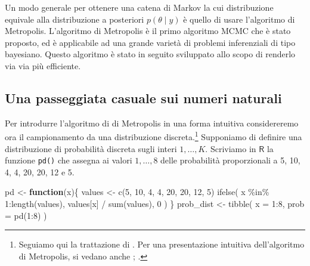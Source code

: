 \documentclass[
  11pt,
]{krantz}
\makeatletter
\newenvironment{Shaded}{\begin{snugshade}}{\end{snugshade}}
\newcommand{\AttributeTok}[1]{\textcolor[rgb]{0.61,0.61,0.61}{#1}}
\newcommand{\ControlFlowTok}[1]{\textcolor[rgb]{0.27,0.27,0.27}{\textbf{#1}}}
\newcommand{\DecValTok}[1]{\textcolor[rgb]{0.06,0.06,0.06}{#1}}
\newcommand{\FunctionTok}[1]{\textcolor[rgb]{0,0,0}{#1}}
\newcommand{\NormalTok}[1]{#1}
\newcommand{\OtherTok}[1]{\textcolor[rgb]{0.37,0.37,0.37}{#1}}
\newcommand{\SpecialCharTok}[1]{\textcolor[rgb]{0,0,0}{#1}}
\newenvironment{kframe}{%
\medskip{}
\setlength{\fboxsep}{.8em}
 \def\at@end@of@kframe{}%
 \ifinner\ifhmode%
  \def\at@end@of@kframe{\end{minipage}}%
  \begin{minipage}{\columnwidth}%
 \fi\fi%
 \def\FrameCommand##1{\hskip\@totalleftmargin \hskip-\fboxsep
 \colorbox{shadecolor}{##1}\hskip-\fboxsep
     \hskip-\linewidth \hskip-\@totalleftmargin \hskip\columnwidth}%
 \MakeFramed {\advance\hsize-\width
   \@totalleftmargin\z@ \linewidth\hsize
   \@setminipage}}%
 {\par\unskip\endMakeFramed%
 \at@end@of@kframe}
\renewenvironment{Shaded}{\begin{kframe}}{\end{kframe}}
\newcommand{\R}{\textsf{R}} %
\theoremstyle{definition}
\theoremstyle{definition}
\theoremstyle{definition}
\theoremstyle{definition}
\theoremstyle{remark}
\makeatother
\begin{document}
Un modo generale per ottenere una catena di Markov la cui distribuzione equivale alla distribuzione a posteriori \(p(\theta \mid y)\) è quello di usare l'algoritmo di Metropolis. L'algoritmo di Metropolis è il primo algoritmo MCMC che è stato proposto, ed è applicabile ad una grande varietà di problemi inferenziali di tipo bayesiano. Questo algoritmo è stato in seguito sviluppato allo scopo di renderlo via via più efficiente.

\hypertarget{una-passeggiata-casuale-sui-numeri-naturali}{%
\subsection{Una passeggiata casuale sui numeri naturali}\label{una-passeggiata-casuale-sui-numeri-naturali}}

Per introdurre l'algoritmo di di Metropolis in una forma intuitiva considereremo ora il campionamento da una distribuzione discreta.\footnote{Seguiamo qui la trattazione di \citet{albert2019probability}. Per una presentazione intuitiva dell'algoritmo di Metropolis, si vedano anche \citet{doing_bayesian_data_an}; \citet{McElreath_rethinking}.} Supponiamo di definire una distribuzione di probabilità discreta sugli interi \(1,\dots, K\). Scriviamo in \(\R\) la funzione \texttt{pd()} che assegna ai valori \(1,\dots, 8\) delle probabilità proporzionali a 5, 10, 4, 4, 20, 20, 12 e 5.

\begin{Shaded}
\begin{Highlighting}[]
\NormalTok{pd }\OtherTok{\textless{}{-}} \ControlFlowTok{function}\NormalTok{(x)\{}
\NormalTok{  values }\OtherTok{\textless{}{-}} \FunctionTok{c}\NormalTok{(}\DecValTok{5}\NormalTok{, }\DecValTok{10}\NormalTok{, }\DecValTok{4}\NormalTok{, }\DecValTok{4}\NormalTok{, }\DecValTok{20}\NormalTok{, }\DecValTok{20}\NormalTok{, }\DecValTok{12}\NormalTok{, }\DecValTok{5}\NormalTok{)}
  \FunctionTok{ifelse}\NormalTok{(}
\NormalTok{    x }\SpecialCharTok{\%in\%} \DecValTok{1}\SpecialCharTok{:}\FunctionTok{length}\NormalTok{(values),}
\NormalTok{    values[x] }\SpecialCharTok{/} \FunctionTok{sum}\NormalTok{(values),}
    \DecValTok{0}
\NormalTok{  )}
\NormalTok{\}}
\NormalTok{prob\_dist }\OtherTok{\textless{}{-}} \FunctionTok{tibble}\NormalTok{(}
  \AttributeTok{x =} \DecValTok{1}\SpecialCharTok{:}\DecValTok{8}\NormalTok{,}
  \AttributeTok{prob =} \FunctionTok{pd}\NormalTok{(}\DecValTok{1}\SpecialCharTok{:}\DecValTok{8}\NormalTok{)}
\NormalTok{)}
\end{Highlighting}
\end{Shaded}
\end{document}

